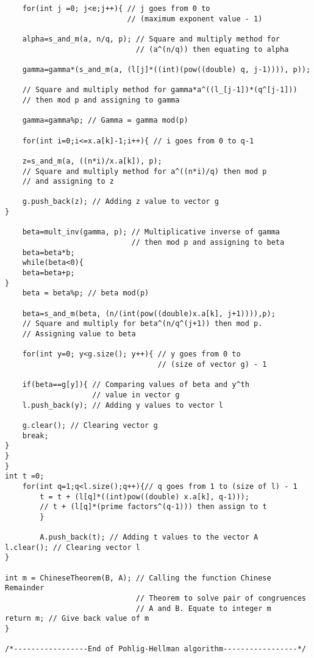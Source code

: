 \documentclass[iwp,first]{luthesis}
\begin{document}
\begin{verbatim}
    for(int j =0; j<e;j++){ // j goes from 0 to 
                            // (maximum exponent value - 1)
   
    alpha=s_and_m(a, n/q, p); // Square and multiply method for 
                              // (a^(n/q)) then equating to alpha

    gamma=gamma*(s_and_m(a, (l[j]*((int)(pow((double) q, j-1)))), p));

    // Square and multiply method for gamma*a^((l_[j-1])*(q^[j-1])) 
    // then mod p and assigning to gamma

    gamma=gamma%p; // Gamma = gamma mod(p)
    
    for(int i=0;i<=x.a[k]-1;i++){ // i goes from 0 to q-1
   
    z=s_and_m(a, ((n*i)/x.a[k]), p);
    // Square and multiply method for a^((n*i)/q) then mod p
    // and assigning to z
   
    g.push_back(z); // Adding z value to vector g
}

    beta=mult_inv(gamma, p); // Multiplicative inverse of gamma 
                             // then mod p and assigning to beta
    beta=beta*b; 
    while(beta<0){
    beta=beta+p;
}
    beta = beta%p; // beta mod(p)
    
    beta=s_and_m(beta, (n/(int(pow((double)x.a[k], j+1)))),p); 
    // Square and multiply for beta^(n/q^(j+1)) then mod p.
    // Assigning value to beta

    for(int y=0; y<g.size(); y++){ // y goes from 0 to 
                                   // (size of vector g) - 1

    if(beta==g[y]){ // Comparing values of beta and y^th 
                    // value in vector g
    l.push_back(y); // Adding y values to vector l
   
    g.clear(); // Clearing vector g
    break;
}
}
}
int t =0;
    for(int q=1;q<l.size();q++){// q goes from 1 to (size of l) - 1
        t = t + (l[q]*((int)pow((double) x.a[k], q-1)));
        // t + (l[q]*(prime factors^(q-1))) then assign to t
        }
        
        A.push_back(t); // Adding t values to the vector A
l.clear(); // Clearing vector l
}

int m = ChineseTheorem(B, A); // Calling the function Chinese Remainder 
                              // Theorem to solve pair of congruences 
                              // A and B. Equate to integer m
return m; // Give back value of m
}

/*-----------------End of Pohlig-Hellman algorithm-----------------*/


\end{verbatim}
\end{document}
